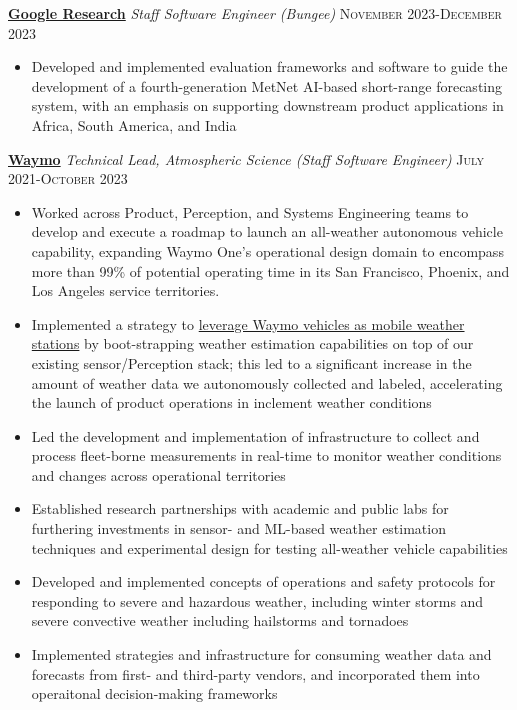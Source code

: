 \documentclass[11pt,letterpaper]{article}
\newcommand{\rdate}[1]{{\addfontfeature{Numbers=OldStyle} \hfill #1}}
\begin{document}
\medskip
\textbf{\href{http://research.google.com}{Google Research}} \newline
\emph{Staff Software Engineer (Bungee)} \rdate{\textsc{November} 2023-\textsc{December} 2023}
\begin{itemize}[itemindent=-10pt]
  \item Developed and implemented evaluation frameworks and software to guide the development of a fourth-generation MetNet AI-based short-range forecasting system, with an emphasis on supporting downstream product applications in Africa, South America, and India
\end{itemize}

\medskip
\textbf{\href{http://www.waymo.com}{Waymo}} \newline
\emph{Technical Lead, Atmospheric Science (Staff Software Engineer)} \rdate{\textsc{July} 2021-\textsc{October} 2023}
\begin{itemize}[itemindent=-10pt]
	\item Worked across Product, Perception, and Systems Engineering teams to develop and execute a roadmap to launch an all-weather autonomous vehicle capability, expanding Waymo One's operational design domain to encompass more than 99\% of potential operating time in its San Francisco, Phoenix, and Los Angeles service territories.
	\item Implemented a strategy to \href{https://waymo.com/blog/2022/11/using-cutting-edge-weather-research-to-advance-the-Waymo-Driver.html}{leverage Waymo vehicles as mobile weather stations} by boot-strapping weather estimation capabilities on top of our existing sensor/Perception stack; this led to a significant increase in the amount of weather data we autonomously collected and labeled, accelerating the launch of product operations in inclement weather conditions
	\item Led the development and implementation of infrastructure to collect and process fleet-borne measurements in real-time to monitor weather conditions and changes across operational territories
	\item Established research partnerships with academic and public labs for furthering investments in sensor- and ML-based weather estimation techniques and experimental design for testing all-weather vehicle capabilities
	\item Developed and implemented concepts of operations and safety protocols for responding to severe and hazardous weather, including winter storms and severe convective weather including hailstorms and tornadoes
	\item Implemented strategies and infrastructure for consuming weather data and forecasts from first- and third-party vendors, and incorporated them into operaitonal decision-making frameworks
\end{itemize}
\end{document}
